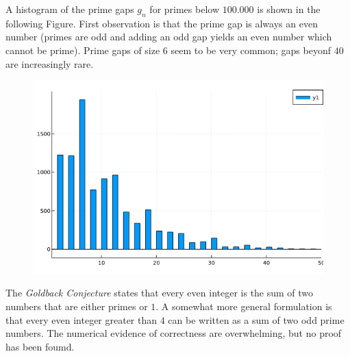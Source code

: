 A histogram of the prime gaps $g_n$ for primes below $100.000$ is shown in the following Figure. First observation is that the prime gap is always an even number (primes are odd and adding an odd gap yields an even number which cannot be prime). Prime gaps of size $6$ seem to be very common; gaps beyonf $40$ are increasingly rare.

\begin{figure}[H]
    \centering
    \includegraphics[scale=0.55]{images/primes_02_01.png}
\end{figure}

The \emph{Goldback Conjecture} states that every even integer is the sum of two numbers that are either primes or $1$. A somewhat more general formulation is that every even integer greater than $4$ can be written as a sum of two odd prime numbers. The numerical evidence of correctness are overwhelming, but no proof has been foumd.


